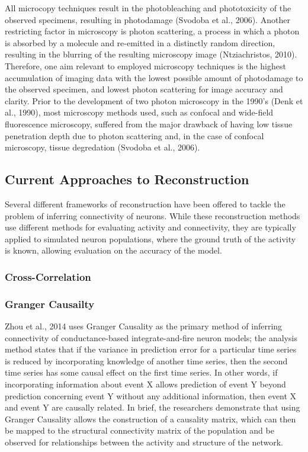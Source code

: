 \documentclass{article}
\begin{document}
All microcopy techniques result in the photobleaching and phototoxicity of the observed specimens, resulting in photodamage (Svodoba et al., 2006). Another restricting factor in microscopy is photon scattering, a process in which a photon is absorbed by a molecule and re-emitted in a distinctly random direction, resulting in the blurring of the resulting microscopy image (Ntziachristos, 2010). Therefore, one aim relevant to employed microscopy techniques is the highest accumulation of imaging data with the lowest possible amount of photodamage to the observed specimen, and lowest photon scattering for image accuracy and clarity. Prior to the development of two photon microscopy in the 1990's (Denk et al., 1990), most microscopy methods used, such as confocal and wide-field fluorescence microscopy, suffered from the major drawback of having low tissue penetration depth due to photon scattering and, in the case of confocal microscopy, tissue degredation (Svodoba et al., 2006).

\subsection{Current Approaches to Reconstruction}
Several different frameworks of reconstruction have been offered to tackle the problem of inferring connectivity of neurons. While these reconstruction methods use different methods for evaluating activity and connectivity, they are typically applied to simulated neuron populations, where the ground truth of the activity is known, allowing evaluation on the accuracy of the model.\par

\subsubsection{Cross-Correlation}


\subsubsection{Granger Causailty}
Zhou et al., 2014 uses Granger Causality as the primary method of inferring connectivity of conductance-based integrate-and-fire neuron models; the analysis method states that if the variance in prediction error for a particular time series is reduced by incorporating knowledge of another time series, then the second time series has some causal effect on the first time series. In other words, if incorporating information about event X allows prediction of event Y beyond prediction concerning event Y without any additional information, then event X and event Y are causally related.  In brief, the researchers demonstrate that using Granger Causality allows the construction of a causality matrix, which can then be mapped to the structural connectivity matrix of the population and be observed for relationships between the activity and structure of the network.\par
\end{document}
